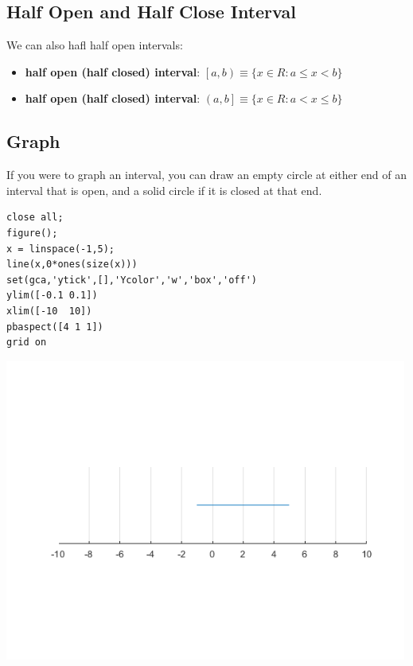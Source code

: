 \documentclass[
]{book}
\begin{document}
\hypertarget{half-open-and-half-close-interval}{%
\subsection{Half Open and Half Close Interval}\label{half-open-and-half-close-interval}}

We can also hafl half open intervals:

\begin{itemize}
\item
  \textbf{half open (half closed) interval}:
  \(\left\lbrack a,b\right)\equiv \lbrace x\in {R}:a\le x<b\rbrace\)
\item
  \textbf{half open (half closed) interval}:
  \(\left(a,b\right\rbrack \equiv \lbrace x\in {R}:a<x\le b\rbrace\)
\end{itemize}

\hypertarget{graph}{%
\subsection{Graph}\label{graph}}

If you were to graph an interval, you can draw an empty circle at either
end of an interval that is open, and a solid circle if it is closed at
that end.

\begin{verbatim}
close all;
figure();
x = linspace(-1,5);
line(x,0*ones(size(x)))
set(gca,'ytick',[],'Ycolor','w','box','off')
ylim([-0.1 0.1])
xlim([-10  10])
pbaspect([4 1 1])
grid on
\end{verbatim}

\includegraphics[width=5.20833in,height=\textheight]{img/interval_images/figure_0.png}
\end{document}

